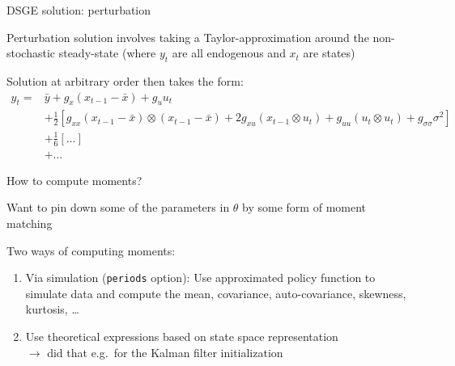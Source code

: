 \begin{frame}{DSGE solution: perturbation}
  \begin{witemize}
    \item Perturbation solution involves taking a Taylor-approximation around the non-stochastic steady-state (where $y_t$ are all endogenous and $x_t$ are states)
    \item Solution at arbitrary order then takes the form:
    \begin{equation}
      \begin{split}
        {y_t} = & \bar y + {g_x}({x_{t - 1}} - \bar x) + {g_u}{u_t}                                                                                                                                     \\
                & + \frac{1}{2}[{g_{xx}}({x_{t - 1}} - \bar x) \otimes ({x_{t - 1}} - \bar x) + 2{g_{xu}}({x_{t - 1}} \otimes {u_t}) + {g_{uu}}({u_t} \otimes {u_t}) + {g_{\sigma \sigma }}{\sigma ^2}] \\
                & + \frac{1}{6}[\ldots]                                                                                                                                                                 \\
                & + \ldots
      \end{split}
    \end{equation}
  \end{witemize}

\end{frame}

\begin{frame}{How to compute moments?}
  \begin{witemize}
    \item Want to pin down some of the parameters in $\theta$ by some form of moment matching
    \item Two ways of computing moments:
    \begin{enumerate}
      \item Via simulation (\texttt{periods} option): Use approximated policy function to simulate data and compute the mean, covariance, auto-covariance, skewness, kurtosis, \ldots
      \item Use theoretical expressions based on state space representation\\
            $\rightarrow$ did that e.g.\ for the Kalman filter initialization
    \end{enumerate}
  \end{witemize}
\end{frame}

